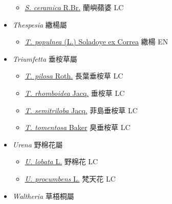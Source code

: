 \begin{itemize}
  \begin{itemize}
        \item[] \href{http://www.theplantlist.org/tpl1.1/search?q=Sterculia+ceramica}{\textit{S. ceramica} R.Br.}   蘭嶼蘋婆 LC
  \end{itemize}
 \item[] \textit{Thespesia} 繖楊屬
                    
  \begin{itemize}
        \item[] \href{http://www.theplantlist.org/tpl1.1/search?q=Thespesia+populnea}{\textit{T. populnea} (L.) Soladoye ex Correa}   繖楊 EN
  \end{itemize}
 \item[] \textit{Triumfetta} 垂桉草屬
                    
  \begin{itemize}
        \item[] \href{http://www.theplantlist.org/tpl1.1/search?q=Triumfetta+pilosa}{\textit{T. pilosa} Roth.}   長葉垂桉草 LC
        \item[] \href{http://www.theplantlist.org/tpl1.1/search?q=Triumfetta+rhomboidea}{\textit{T. rhomboidea} Jacq.}     垂桉草 LC
        \item[] \href{http://www.theplantlist.org/tpl1.1/search?q=Triumfetta+semitriloba}{\textit{T. semitriloba} Jacq.}   菲島垂桉草 LC
        \item[] \href{http://www.theplantlist.org/tpl1.1/search?q=Triumfetta+tomentosa}{\textit{T. tomentosa} Baker}   臭垂桉草 LC
  \end{itemize}
 \item[] \textit{Urena} 野棉花屬
                    
  \begin{itemize}
        \item[] \href{http://www.theplantlist.org/tpl1.1/search?q=Urena+lobata}{\textit{U. lobata} L.}   野棉花 LC
        \item[] \href{http://www.theplantlist.org/tpl1.1/search?q=Urena+procumbens}{\textit{U. procumbens} L.}   梵天花 LC
  \end{itemize}
 \item[] \textit{Waltheria} 草梧桐屬
                    

\end{itemize}
